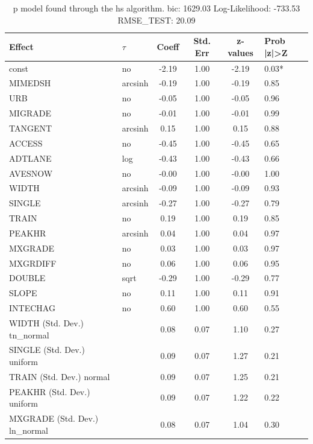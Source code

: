 \begin{table}
	\caption{p model found through the hs algorithm. bic: 1629.03 Log-Likelihood: -733.53 RMSE_TEST: 20.09}
	\begin{center}
		\begin{tabular}{|l|l|c|c|c|l|}
			\hline
			Effect & $\tau$ & Coeff & Std. Err & z-values & Prob |z|>Z \\
			\hline
			const & no & -2.19 & 1.00 & -2.19 & 0.03* \\
			\hline
			MIMEDSH & arcsinh & -0.19 & 1.00 & -0.19 & 0.85 \\
			\hline
			URB & no & -0.05 & 1.00 & -0.05 & 0.96 \\
			\hline
			MIGRADE & no & -0.01 & 1.00 & -0.01 & 0.99 \\
			\hline
			TANGENT & arcsinh & 0.15 & 1.00 & 0.15 & 0.88 \\
			\hline
			ACCESS & no & -0.45 & 1.00 & -0.45 & 0.65 \\
			\hline
			ADTLANE & log & -0.43 & 1.00 & -0.43 & 0.66 \\
			\hline
			AVESNOW & no & -0.00 & 1.00 & -0.00 & 1.00 \\
			\hline
			WIDTH & arcsinh & -0.09 & 1.00 & -0.09 & 0.93 \\
			\hline
			SINGLE & arcsinh & -0.27 & 1.00 & -0.27 & 0.79 \\
			\hline
			TRAIN & no & 0.19 & 1.00 & 0.19 & 0.85 \\
			\hline
			PEAKHR & arcsinh & 0.04 & 1.00 & 0.04 & 0.97 \\
			\hline
			MXGRADE & no & 0.03 & 1.00 & 0.03 & 0.97 \\
			\hline
			MXGRDIFF & no & 0.06 & 1.00 & 0.06 & 0.95 \\
			\hline
			DOUBLE & sqrt & -0.29 & 1.00 & -0.29 & 0.77 \\
			\hline
			SLOPE & no & 0.11 & 1.00 & 0.11 & 0.91 \\
			\hline
			INTECHAG & no & 0.60 & 1.00 & 0.60 & 0.55 \\
			\hline
			WIDTH (Std. Dev.) tn_normal &  & 0.08 & 0.07 & 1.10 & 0.27 \\
			\hline
			SINGLE (Std. Dev.) uniform &  & 0.09 & 0.07 & 1.27 & 0.21 \\
			\hline
			TRAIN (Std. Dev.) normal &  & 0.09 & 0.07 & 1.25 & 0.21 \\
			\hline
			PEAKHR (Std. Dev.) uniform &  & 0.09 & 0.07 & 1.22 & 0.22 \\
			\hline
			MXGRADE (Std. Dev.) ln_normal &  & 0.08 & 0.07 & 1.04 & 0.30 \\

\end{tabular}
\end{center}
\end{table}
